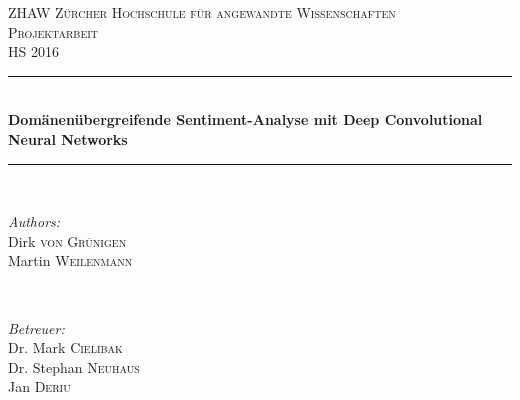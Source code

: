 \begin{titlepage}
	
	\newcommand{\HRule}{\rule{\linewidth}{0.5mm}} %
	
	\center %
	
	
	\textsc{\LARGE ZHAW Zürcher Hochschule für angewandte Wissenschaften}\\[2.0cm] %
	\textsc{\Large Projektarbeit}\\[0.5cm] %
	\textsc{\large HS 2016}\\[0.5cm] %
	
	
	\HRule \\[0.4cm]
	{ \huge \bfseries Domänenübergreifende Sentiment-Analyse mit Deep Convolutional Neural Networks}\\[0.4cm] %
	\HRule \\[1.5cm]
	
	
	\begin{minipage}{0.4\textwidth}
		\begin{flushleft} \large
			\emph{Authors:}\\
			Dirk \textsc{von Grünigen}\\
			Martin \textsc{Weilenmann}
		\end{flushleft}
	\end{minipage}
	~
	\begin{minipage}{0.4\textwidth}
		\begin{flushright} \large
			\emph{Betreuer:} \\
			Dr. Mark \textsc{Cielibak}\\
			Dr. Stephan \textsc{Neuhaus}\\
			Jan \textsc{Deriu}
		\end{flushright}
	\end{minipage}\\[2cm]
	

\end{titlepage}
